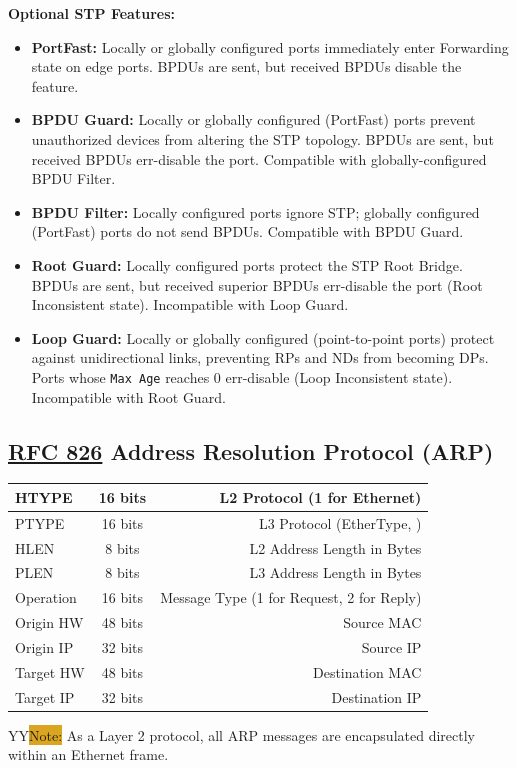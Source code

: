 \documentclass[12pt]{article}
\newcommand{\printColor}{Y}								%
\newcommand{\note}[1]{\if\printColor Y{\colorbox{#1}{Note:}}\else{\underline{Note:}}\fi}
\newcommand{\RFC}[1]{\href{https://datatracker.ietf.org/doc/html/rfc#1}{RFC #1}}
\begin{document}
	\textbf{Optional STP Features:}
	\begin{itemize}
		\label{itm:STP FEATURES}
		\item{\textbf{PortFast:} Locally or globally configured ports immediately enter Forwarding state on edge ports. BPDUs are sent, but received BPDUs disable the feature.}
		\item{\textbf{BPDU Guard:} Locally or globally configured (PortFast) ports prevent unauthorized devices from altering the STP topology. BPDUs are sent, but received BPDUs err-disable the port. Compatible with globally-configured BPDU Filter.}
		\item{\textbf{BPDU Filter:} Locally configured ports ignore STP; globally configured (PortFast) ports do not send BPDUs. Compatible with BPDU Guard.}
		\item{\textbf{Root Guard:} Locally configured ports protect the STP Root Bridge. BPDUs are sent, but received superior BPDUs err-disable the port (Root Inconsistent state). Incompatible with Loop Guard.}
		\item{\textbf{Loop Guard:} Locally or globally configured (point-to-point ports) protect against unidirectional links, preventing RPs and NDs from becoming DPs. Ports whose \texttt{Max Age} reaches 0 err-disable (Loop Inconsistent state). Incompatible with Root Guard.}
	\end{itemize}


	\subsection[RFC 826 ARP]{\RFC{826} Address Resolution Protocol (ARP) \label{subsec:ARP}}
	\begin{table}[H]
	\centering
	\begin{tabular}{| l | c | r |}\hline
	HTYPE	& 16 bits	& L2 Protocol (1 for Ethernet)\\\hline
	PTYPE	& 16 bits	& L3 Protocol (EtherType, \Cref{tab:ETHERTYPE})\\\hline
	HLEN		& 8 bits	& L2 Address Length in Bytes\\\hline
	PLEN		& 8 bits	& L3 Address Length in Bytes\\\hline
	Operation	& 16 bits	& Message Type (1 for Request, 2 for Reply)\\\hline
	Origin HW 	& 48 bits	& Source MAC\\\hline
	Origin IP	& 32 bits	& Source IP\\\hline
	Target HW 	& 48 bits	& Destination MAC\\\hline
	Target IP	& 32 bits	& Destination IP\\\hline
	\end{tabular}\end{table}
	\note{Goldenrod} As a Layer 2 protocol, all ARP messages are encapsulated directly within an Ethernet frame.
\end{document}
